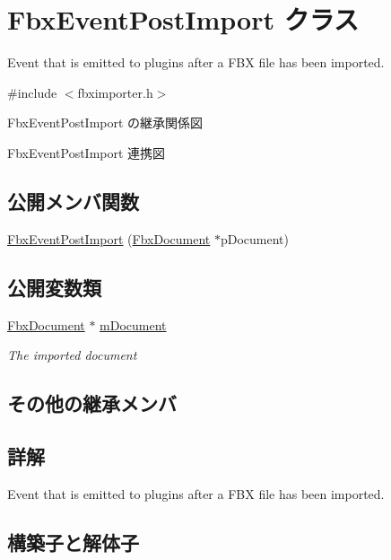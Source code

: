 \hypertarget{class_fbx_event_post_import}{}\section{Fbx\+Event\+Post\+Import クラス}
\label{class_fbx_event_post_import}


Event that is emitted to plugins after a F\+BX file has been imported.  




{\ttfamily \#include $<$fbximporter.\+h$>$}



Fbx\+Event\+Post\+Import の継承関係図


Fbx\+Event\+Post\+Import 連携図
\subsection*{公開メンバ関数}
\begin{DoxyCompactItemize}
\item 
\hyperlink{class_fbx_event_post_import_aefcd44e6871e671e571f3f378ceab40a}{Fbx\+Event\+Post\+Import} (\hyperlink{class_fbx_document}{Fbx\+Document} $\ast$p\+Document)
\end{DoxyCompactItemize}
\subsection*{公開変数類}
\begin{DoxyCompactItemize}
\item 
\hyperlink{class_fbx_document}{Fbx\+Document} $\ast$ \hyperlink{class_fbx_event_post_import_a9e7d9e8702a8e82a81409d1393845a1a}{m\+Document}
\begin{DoxyCompactList}\small\item\em The imported document \end{DoxyCompactList}\end{DoxyCompactItemize}
\subsection*{その他の継承メンバ}


\subsection{詳解}
Event that is emitted to plugins after a F\+BX file has been imported. 

\subsection{構築子と解体子}
\mbox{\label{class_fbx_event_post_import_aefcd44e6871e671e571f3f378ceab40a}} 

